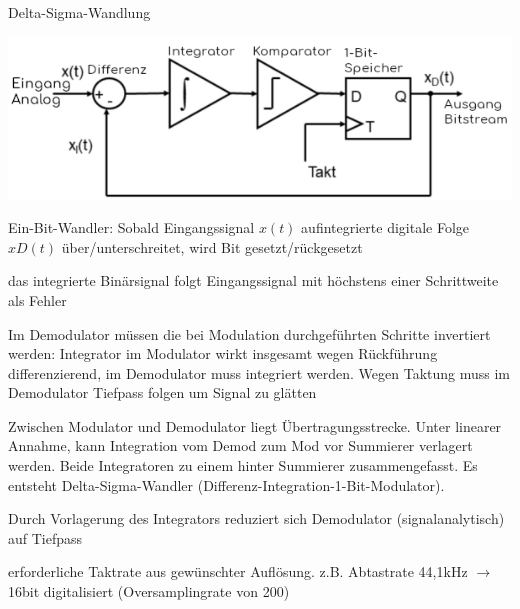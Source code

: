 \documentclass[a4paper]{article}
\begin{document}
\begin{multicols}{3}
  Delta-Sigma-Wandlung
\begin{center}
  \includegraphics[width=.4\linewidth]{Assets/Biosignalverarbeitung-Delta-Sigma-Wandler.png}
\end{center}
  \begin{itemize*}
    \item Ein-Bit-Wandler: Sobald Eingangssignal $x(t)$ aufintegrierte digitale Folge $xD(t)$ über/unterschreitet, wird Bit gesetzt/rückgesetzt
    \item das integrierte Binärsignal folgt Eingangssignal mit höchstens einer Schrittweite als Fehler
    \item Im Demodulator müssen die bei Modulation durchgeführten Schritte invertiert werden: Integrator im Modulator wirkt insgesamt wegen Rückführung differenzierend, im Demodulator muss integriert werden. Wegen Taktung muss im Demodulator Tiefpass folgen um Signal zu glätten
    \item Zwischen Modulator und Demodulator liegt Übertragungsstrecke. Unter linearer Annahme, kann Integration vom Demod zum Mod vor Summierer verlagert werden. Beide Integratoren zu einem hinter Summierer zusammengefasst. Es entsteht Delta-Sigma-Wandler (Differenz-Integration-1-Bit-Modulator).
    \item Durch Vorlagerung des Integrators reduziert sich Demodulator (signalanalytisch) auf Tiefpass
    \item erforderliche Taktrate aus gewünschter Auflösung. z.B. Abtastrate 44,1kHz $\rightarrow$ 16bit digitalisiert %
    (Oversamplingrate von 200)
  \end{itemize*}


\end{multicols}
\end{document}
